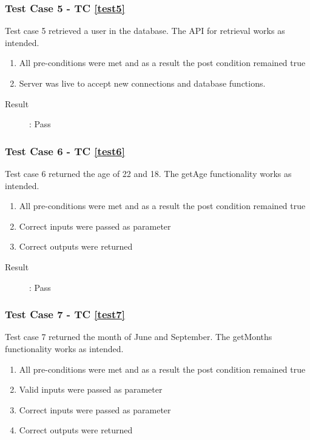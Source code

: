 \documentclass{article}
\begin{document}
\subsubsection{Test Case 5 - TC \ref{test5}}
Test case 5 retrieved a user in the database.
The API for retrieval works as intended.
\begin{enumerate}
	\item All pre-conditions were met and as a result the post condition remained true
	\item Server was live to accept new connections and database functions.
\end{enumerate}

\begin{description}
	\item [Result]: Pass 
\end{description}

\subsubsection{Test Case 6 - TC \ref{test6}}
Test case 6 returned the age of 22 and 18. 
The getAge functionality works as intended.
\begin{enumerate}
	\item All pre-conditions were met and as a result the post condition remained true
	\item Correct inputs were passed as parameter 
	\item Correct outputs were returned
\end{enumerate}

\begin{description}
	\item [Result]: Pass 
\end{description}

\subsubsection{Test Case 7 - TC \ref{test7}}
Test case 7 returned the month of June and September. 
The getMonths functionality works as intended.
\begin{enumerate}
	\item All pre-conditions were met and as a result the post condition remained true
	\item Valid inputs were passed as parameter 
	\item Correct inputs were passed as parameter 
	\item Correct outputs were returned
\end{enumerate}
\end{document}
